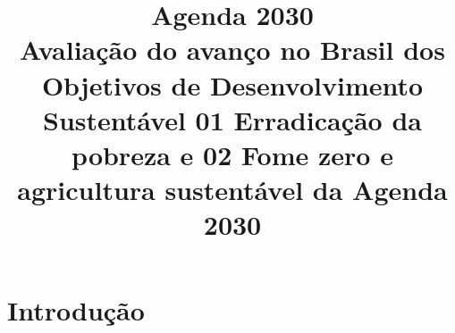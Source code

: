 
\title{Agenda 2030\\
{\normalsize Avaliação do avanço no Brasil dos Objetivos de Desenvolvimento Sustentável 01 Erradicação da pobreza e 02 Fome zero e agricultura sustentável da Agenda 2030}}
\def\autor{Jhonatan \\
Oscar Sérgio Monteiro\\
Vinícius Dutra}
\def\disciplina{SC329 - Sustentabilidade  Ambiental e Social, turma b}
\def\professor{Elcídio Henriques  Quiraque}


\chapter{Introdução}
